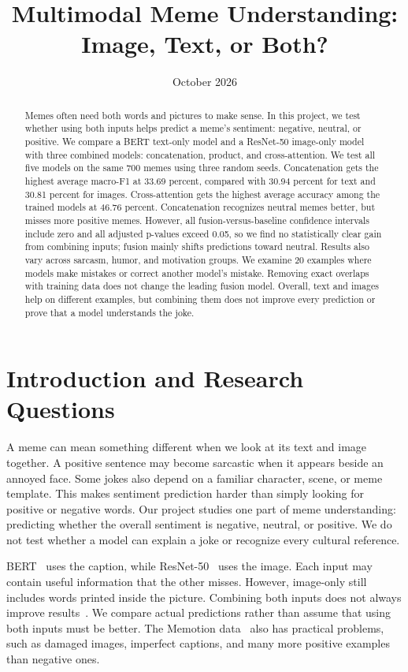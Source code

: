 \documentclass[11pt,a4paper]{article}
\title{\textbf{Multimodal Meme Understanding: Image, Text, or Both?}}
\author{}
\date{October 2026}
\begin{document}
\maketitle

\begin{abstract}
Memes often need both words and pictures to make sense. In this project, we test whether using both inputs helps predict a meme's sentiment: negative, neutral, or positive. We compare a BERT text-only model and a ResNet-50 image-only model with three combined models: concatenation, product, and cross-attention. We test all five models on the same 700 memes using three random seeds. Concatenation gets the highest average macro-F1 at 33.69 percent, compared with 30.94 percent for text and 30.81 percent for images. Cross-attention gets the highest average accuracy among the trained models at 46.76 percent. Concatenation recognizes neutral memes better, but misses more positive memes. However, all fusion-versus-baseline confidence intervals include zero and all adjusted p-values exceed 0.05, so we find no statistically clear gain from combining inputs; fusion mainly shifts predictions toward neutral. Results also vary across sarcasm, humor, and motivation groups. We examine 20 examples where models make mistakes or correct another model's mistake. Removing exact overlaps with training data does not change the leading fusion model. Overall, text and images help on different examples, but combining them does not improve every prediction or prove that a model understands the joke.

\end{abstract}
\section{Introduction and Research Questions}
\label{sec:intro}

A meme can mean something different when we look at its text and image together. A positive sentence may become sarcastic when it appears beside an annoyed face. Some jokes also depend on a familiar character, scene, or meme template. This makes sentiment prediction harder than simply looking for positive or negative words. Our project studies one part of meme understanding: predicting whether the overall sentiment is negative, neutral, or positive. We do not test whether a model can explain a joke or recognize every cultural reference.

BERT~\cite{devlin2019bert} uses the caption, while ResNet-50~\cite{he2016deep} uses the image. Each input may contain useful information that the other misses. However, image-only still includes words printed inside the picture. Combining both inputs does not always improve results~\cite{bonheme2020sesam}. We compare actual predictions rather than assume that using both inputs must be better. The Memotion data~\cite{sharma2020semeval} also has practical problems, such as damaged images, imperfect captions, and many more positive examples than negative ones.
\end{document}
